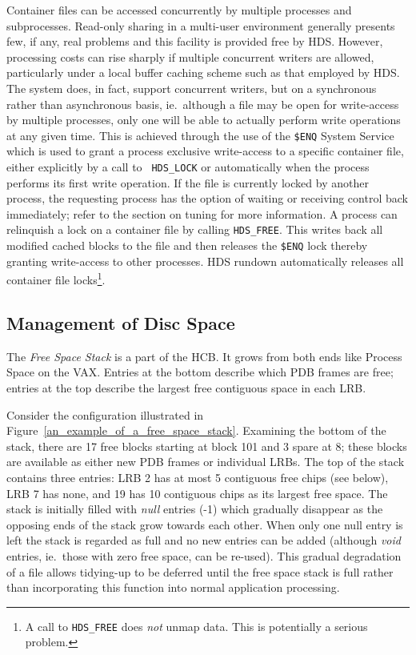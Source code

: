 Container files can be accessed concurrently by multiple processes and
subprocesses. Read-only sharing in a multi-user environment generally presents
few, if any, real problems and this facility is provided free by HDS. However,
processing costs can rise sharply if multiple concurrent writers are allowed,
particularly under a local buffer caching scheme such as that employed by HDS.
The system does, in fact, support concurrent writers, but on a synchronous
rather than asynchronous basis, ie.\ although a file may be open for
write-access by multiple processes, only one will be able to actually perform
write operations at any given time. This is achieved through the use of the
{\tt \$ENQ} System Service which is used to grant a process exclusive
write-access to a specific container file, either explicitly by a call to {\tt
HDS\_LOCK} or automatically when the process performs its first write
operation. If the file is currently locked by another process, the requesting
process has the option of waiting or receiving control back immediately; refer
to the section on tuning for more information. A process can relinquish a lock
on a container file by calling {\tt HDS\_FREE}. This writes back all modified
cached blocks to the file and then releases the {\tt \$ENQ} lock thereby
granting write-access to other processes. HDS rundown automatically releases
all container file locks\footnote{A call to {\tt HDS\_FREE} does {\em not}
unmap data. This is potentially a serious problem.}. 

\subsection {Management of Disc Space}
\label {disc_space_management}

The {\em Free Space Stack} is a part of the HCB. It grows from both ends like
Process Space on the VAX. Entries at the bottom describe which  PDB frames are
free; entries at the top describe the largest free contiguous space in each LRB.

Consider the configuration illustrated in
Figure~\ref{an_example_of_a_free_space_stack}. Examining the bottom of the
stack, there are 17 free blocks starting at block 101 and 3 spare at 8; these
blocks are available as either new PDB frames or individual LRBs. The top of the
stack contains three entries: LRB 2 has at most 5 contiguous free chips (see
below), LRB 7 has none, and 19 has 10 contiguous chips as its largest free
space. The stack is initially filled with {\em null} entries (-1) which
gradually disappear as the opposing ends of the stack grow towards each other.
When only one null entry is left the stack is regarded as full and no new
entries can be added (although {\em void} entries, ie.\ those with zero free
space, can be re-used). This gradual degradation of a file allows tidying-up to
be deferred until the free space stack is full rather than incorporating this
function into normal application processing.

